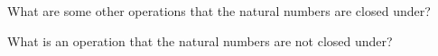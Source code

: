 \begin{question}
  What are some other operations that the natural numbers are closed under?
\end{question}

\begin{question}
  What is an operation that the natural numbers are not closed under?
\end{question}


%
%
%
%
%

